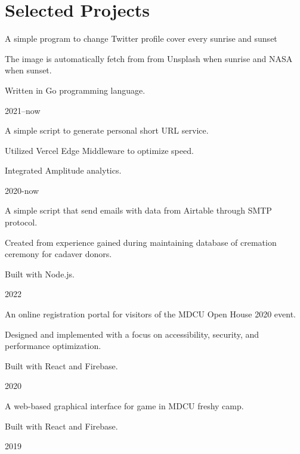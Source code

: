 \documentclass{cv}
\begin{document}
\section{Selected Projects}
\begin{cv_table}
  {\begin{cv_itemize}
      \item A simple program to change Twitter profile cover every sunrise and sunset
      \item The image is automatically fetch from from Unsplash when sunrise and NASA when sunset.
      \item Written in Go programming language.
    \end{cv_itemize}
  }{}{2021--now}
  {\begin{cv_itemize}
      \item A simple script to generate personal short URL service.
      \item Utilized Vercel Edge Middleware to optimize speed.
      \item Integrated Amplitude analytics.
    \end{cv_itemize}
  }{}{2020-now}
  {\begin{cv_itemize}
      \item A simple script that send emails with data from Airtable through SMTP protocol.
      \item Created from experience gained during maintaining database of cremation ceremony for cadaver donors.
      \item Built with Node.js.
    \end{cv_itemize}
  }{}{2022}
  {\begin{cv_itemize}
      \item An online registration portal for visitors of the MDCU Open House 2020 event.
      \item Designed and implemented with a focus on accessibility, security, and performance optimization.
      \item Built with React and Firebase.
    \end{cv_itemize}
  }{}{2020}
  {\begin{cv_itemize}
      \item A web-based graphical interface for game in MDCU freshy camp.
      \item Built with React and Firebase.
    \end{cv_itemize}
  }{}{2019}
\end{cv_table}
\end{document}
